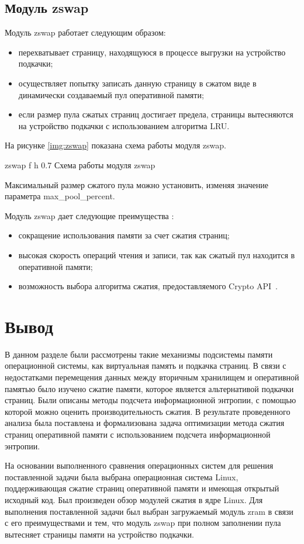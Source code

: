 \subsection{Модуль zswap}

Модуль zswap работает следующим образом:

\begin{itemize}
    \item перехватывает страницу, находящуюся в процессе выгрузки на устройство подкачки;
    \item осуществляет попытку записать данную страницу в сжатом виде в динамически создаваемый пул оперативной памяти;
    \item если размер пула сжатых страниц достигает предела, страницы вытесняются на устройство подкачки с использованием алгоритма LRU.
\end{itemize}

На рисунке \ref{img:zswap} показана схема работы модуля zswap.

    {zswap}
    {f}
    {h}
    {0.7\textwidth}
    {Схема работы модуля zswap}

Максимальный размер сжатого пула можно установить, изменяя значение параметра max\_pool\_percent.

Модуль zswap дает следующие преимущества \cite{zswap}:

\begin{itemize}
	\item сокращение использования памяти за счет сжатия страниц;
	\item высокая скорость операций чтения и записи, так как сжатый пул находится в оперативной памяти;
    \item возможность выбора алгоритма сжатия, предоставляемого Crypto API~\cite{crypto}.
\end{itemize}

\section*{Вывод}

В данном разделе были рассмотрены такие механизмы подсистемы памяти операционной системы, как виртуальная память и подкачка страниц. В связи с недостатками перемещения данных между вторичным хранилищем и оперативной памятью было изучено сжатие памяти, которое является альтернативой подкачки страниц. Были описаны методы подсчета информационной энтропии, с помощью которой можно оценить производительность сжатия. В результате проведенного анализа была поставлена и формализована задача оптимизации метода сжатия страниц оперативной памяти с использованием подсчета информационной энтропии.

На основании выполненного сравнения операционных систем для решения поставленной задачи была выбрана операционная система Linux, поддерживающая сжатие страниц оперативной памяти и имеющая открытый исходный код. Был произведен обзор модулей сжатия в ядре Linux. Для выполнения поставленной задачи был выбран загружаемый модуль zram в связи с его преимуществами и тем, что модуль zswap при полном заполнении пула вытесняет страницы памяти на устройство подкачки.
